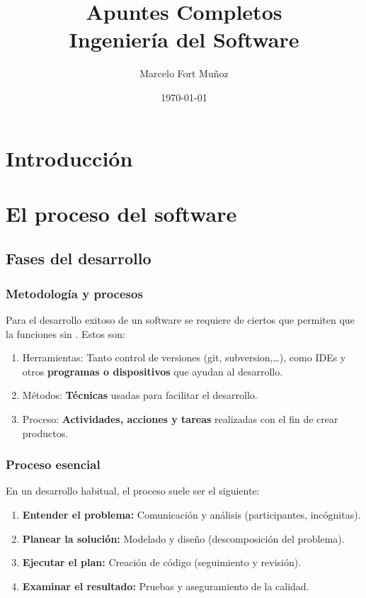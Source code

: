 \documentclass[a4paper,11pt]{report}
\title{Apuntes Completos \\ \large Ingeniería del Software}
\author{Marcelo Fort Muñoz}
\date{\today}
\begin{document}
    \maketitle
    \tableofcontents
    \newpage


    \chapter{Introducción}\label{ch:introduccion}
    

    \chapter{El proceso del software}\label{ch:el-proceso-del-software}
    \minitoc
    \section{Fases del desarrollo}
    \subsection{Metodología y procesos}
    Para el desarrollo exitoso de un software se requiere de ciertos  que permiten que la  funciones sin . Estos  son:
    \begin{enumerate}
        \item Herramientas: Tanto control de versiones (git, subversion,\dots), como IDEs y otros \textbf{programas o dispositivos} que ayudan al desarrollo.
        \item Métodos: \textbf{Técnicas} usadas para facilitar el desarrollo.
        \item Proceso: \textbf{Actividades, acciones y tareas} realizadas con el fin de crear productos.
    \end{enumerate}

    \subsection{Proceso esencial}
    En un desarrollo habitual, el proceso suele ser el siguiente:

    \begin{enumerate}
        \item \textbf{Entender el problema:} Comunicación y análisis (participantes, incógnitas).
        \item \textbf{Planear la solución:} Modelado y diseño (descomposición del problema).
        \item \textbf{Ejecutar el plan:} Creación de código (seguimiento y revisión).
        \item \textbf{Examinar el resultado:} Pruebas y aseguramiento de la calidad.
    \end{enumerate}
\end{document}
